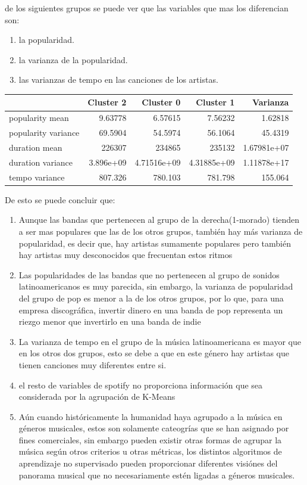 \documentclass[11pt]{article}
\begin{document}
de los siguientes grupos se puede ver que las variables que mas los diferencian
son:
\begin{enumerate}
\item la popularidad.
\item la varianza de la popularidad.
\item las varianzas de tempo en las canciones de los artistas.
\end{enumerate}

\begin{center}
\begin{tabular}{lrrrr}
 & Cluster 2 & Cluster 0 & Cluster 1 & Varianza\\
\hline
popularity mean & 9.63778 & 6.57615 & 7.56232 & 1.62818\\
popularity variance & 69.5904 & 54.5974 & 56.1064 & 45.4319\\
duration mean & 226307 & 234865 & 235132 & 1.67981e+07\\
duration variance & 3.896e+09 & 4.71516e+09 & 4.31885e+09 & 1.11878e+17\\
tempo variance & 807.326 & 780.103 & 781.798 & 155.064\\
\end{tabular}
\end{center}

De esto se puede concluir que:

\begin{enumerate}
\item Aunque las bandas que pertenecen al grupo de la derecha(1-morado) tienden a ser mas populares que las de los otros grupos, también hay más varianza de popularidad, es decir que, hay artistas sumamente populares pero también hay artistas muy desconocidos que frecuentan estos ritmos
\item Las popularidades de las bandas que no pertenecen al grupo de sonidos latinoamericanos es muy parecida, sin embargo, la varianza de popularidad del grupo de pop es menor a la de los otros grupos, por lo que, para una empresa discográfica, invertir dinero en una banda de pop representa un riezgo menor que invertirlo en una banda de indie
\item La varianza de tempo en el grupo de la música latinoamericana es mayor que en los otros dos grupos, esto se debe a que en este género hay artistas que tienen canciones muy diferentes entre si.
\item el resto de variables de spotify no proporciona información que sea considerada por la agrupación de K-Means
\item Aún cuando históricamente la humanidad haya agrupado a la música en géneros musicales, estos son solamente cateogrías que se han asignado por fines comerciales, sin embargo pueden existir otras formas de agrupar la música según otros criterios u otras métricas, los distintos algoritmos de aprendizaje no supervisado pueden proporcionar diferentes visiónes del panorama musical que no necesariamente estén ligadas a géneros musicales.
\end{enumerate}
\end{document}
